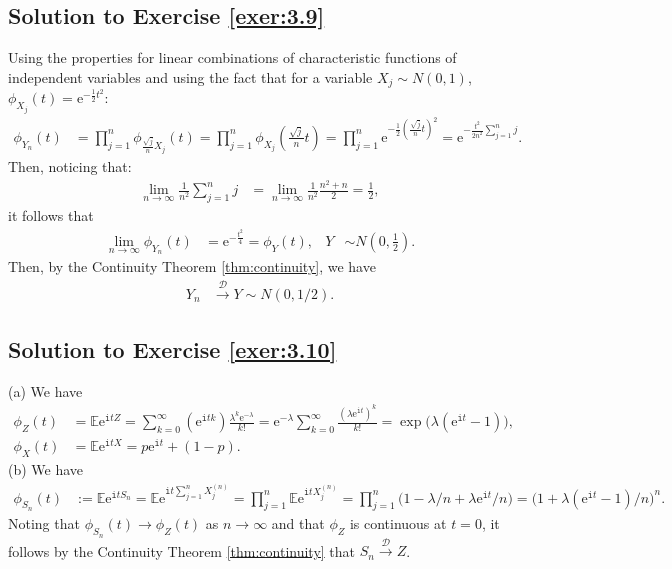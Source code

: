 \documentclass[12pt]{book}
\numberwithin{equation}{chapter}
\theoremstyle{plain}
\numberwithin{theorem}{section}
\theoremstyle{definition}
\numberwithin{exercise}{chapter}
\newcommand{\<}{\langle}
\renewcommand{\>}{\rangle}
\renewcommand{\(}{\left(}
\renewcommand{\)}{\right)}
\renewcommand{\[}{\left[}
\renewcommand{\]}{\right]}
\newcommand\Eb{\mathds{E}}
\newcommand\Dc{\mathscr{D}}
\newcommand\lam{\lambda}
\newcommand\ii{\mathtt{i}}
\newcommand\ee{\mathrm{e}}
\begin{document}
\subsection*{Solution to Exercise \ref{exer:3.9}}
Using the properties for linear combinations of characteristic functions of independent variables and using the fact that for a variable $X_j\sim N(0,1)$, $\phi_{X_j}(t)=\ee^{-\frac{1}{2}t^2}$:
\begin{align}
\phi_{Y_n}(t)
	&=	\prod_{j=1}^n\phi_{\frac{\sqrt{j}}{n}X_j}(t)=\prod_{j=1}^n\phi_{X_j}(\frac{\sqrt{j}}{n}t)
	=		\prod_{j=1}^n \ee^{-\frac{1}{2}(\frac{\sqrt{j}}{n}t)^2}
	=		\ee^{-\frac{t^2}{2n^2}\sum_{j=1}^n j} .
\end{align}
Then, noticing that:
\begin{align}
\lim_{n\rightarrow \infty}\frac{1}{n^2}\sum_{j=1}^n j
	&=	\lim_{n\rightarrow \infty}\frac{1}{n^2}\frac{n^2+n}{2}=\frac{1}{2} ,
\end{align}
it follows that 
\begin{align}
\lim_{n\rightarrow \infty}\phi_{Y_n}(t)
	&=	\ee^{-\frac{t^2}{4}}=\phi_Y(t), &
Y
	&\sim N(0,\frac{1}{2}) .
\end{align}
Then, by the Continuity Theorem \ref{thm:continuity}, we have
\begin{align}
Y_n
	&\stackrel{\Dc}{\rightarrow} Y \sim N(0,1/2) .
\end{align}

\subsection*{Solution to Exercise \ref{exer:3.10}}
(a) We have
\begin{align}
\phi_Z(t)
	&=	\Eb \ee^{\ii t Z}
	=		\sum_{k=0}^\infty (\ee^{\ii t k}) \frac{\lam^k \ee^{-\lam}}{k!}
	=		\ee^{-\lam} \sum_{k=0}^\infty \frac{(\lam \ee^{\ii t})^k }{k!}
	=		\exp \Big( \lam(\ee^{\ii t} - 1 ) \Big) , \\
\phi_X(t)
	&=	\Eb \ee^{\ii t X}
	=		p \ee^{\ii t} + (1-p) .
\end{align}
(b)
We have
\begin{align}
\phi_{S_n}(t)
	&:=	\Eb \ee^{\ii t S_n}
	=		\Eb \ee^{\ii t \sum_{j=1}^n X_j^{(n)}}
	=		\prod_{j=1}^n \Eb \ee^{\ii t X_j^{(n)}}
	=		\prod_{j=1}^n \Big( 1 - \lam/n + \lam \ee^{\ii t} / n \Big)
	=		\Big( 1 + \lam ( \ee^{\ii t} -1 ) / n \Big)^n .
\end{align}
Noting that $\phi_{S_n}(t) \to \phi_Z(t)$ as $n \to \infty$ and that $\phi_Z$ is continuous at $t=0$, it follows by the Continuity Theorem \ref{thm:continuity} that $S_n \stackrel{\Dc}{\to} Z$.
\end{document}
